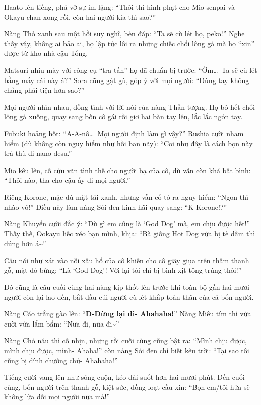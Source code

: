 \documentclass[../main.tex]{subfiles}
\begin{document}
Haato lên tiếng, phá vỡ sự im lặng: ``Thôi thì hình phạt cho Mio-senpai và Okayu-chan xong rồi, còn hai người kia thì sao?''

Nàng Thỏ xanh sau một hồi suy nghĩ, bèn đáp: ``Ta sẽ cù lét họ, peko!'' Nghe thấy vậy, không ai bảo ai, họ lập tức lôi ra những chiếc chổi lông gà mà họ ``xin'' được từ kho nhà cậu Tổng.

Matsuri nhíu mày với công cụ ``tra tấn'' họ đã chuẩn bị trước: ``Ờm\dots\ Ta sẽ cù lét bằng mấy cái này á?'' Sora cũng gật gù, góp ý với mọi người: ``Dùng tay không chẳng phải tiện hơn sao?''

Mọi người nhìn nhau, đồng tình với lời nói của nàng Thần tượng. Họ bỏ hết chổi lông gà xuống, quay sang bốn cô gái rồi giơ hai bàn tay lên, lắc lắc ngón tay.

Fubuki hoảng hốt: ``A-A-nô\dots\ Mọi người định làm gì vậy?'' Rushia cười nham hiểm (dù không còn nguy hiểm như hồi ban nãy): ``Coi như đây là cách bọn này trả thù đi-nano desu.''

Mio kêu lên, cố cứu vãn tình thế cho người bạ của cô, dù vẫn còn khá bất bình: ``Thôi nào, tha cho cậu ấy đi mọi người.''

Riêng Korone, mặc dù mặt tái xanh, nhưng vẫn cố tỏ ra nguy hiểm: ``Ngon thì nhào vô!'' Điều này làm nàng Sói đen kinh hãi quay sang: ``K-Korone!?''

Nàng Khuyển cười đắc ý: ``Dù gì em cũng là `God Dog' mà, em chịu được hết!'' Thấy thế, Ookayu liếc xéo bạn mình, khịa: ``Bà giống Hot Dog vừa bị tè dầm thì đúng hơn á\~{}''

Câu nói như xát vào nỗi xấu hổ của cô khiến cho cô giãy giụa trên thấm thanh gỗ, mặt đỏ bừng: ``Là `God Dog'! Với lại tôi chỉ bị bình xịt tông trúng thôi!''

Đó cũng là câu cuối cùng hai nàng kịp thốt lên trước khi toàn bộ gần hai mươi người còn lại lao đến, bắt đầu cúi người cù lét khắp toàn thân của cả bốn người.

Nàng Cáo trắng gào lên: ``\textbf{D-Dừng lại đi- Ahahaha!}'' Nàng Miêu tím thì vừa cười vừa lẩm bẩm: ``Nữa đi, nữa đi\~{}''

Nàng Chó nâu thì cố nhịn, nhưng rồi cuối cùng cũng bật ra: ``Mình chịu được, mình chịu được, mình- Ahaha!'' còn nàng Sói đen chỉ biết kêu trời: ``Tại sao tôi cũng bị dính chưởng chứ- Ahahaha!''

Tiếng cười vang lên như sóng cuộn, kéo dài suốt hơn hai mươi phút. Đến cuối cùng, bốn người trên thanh gỗ, kiệt sức, đồng loạt cầu xin: ``Bọn em/tôi hứa sẽ không lừa dối mọi người nữa mà!''
\end{document}

